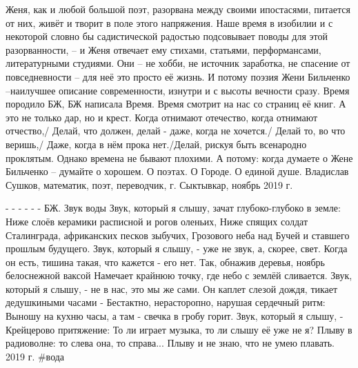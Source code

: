 Женя, как и любой большой поэт, разорвана между своими ипостасями, питается от них, живёт и творит в поле этого напряжения. Наше время в изобилии и с некоторой словно бы садистической радостью подсовывает поводы для этой разорванности, – и Женя отвечает ему стихами, статьями, перформансами, литературными студиями. Они – не хобби, не источник заработка, не спасение от повседневности – для неё это просто её жизнь. И потому поэзия Жени Бильченко –наилучшее описание современности, изнутри и с высоты вечности сразу. Время породило БЖ, БЖ написала Время. Время смотрит на нас со страниц её книг. А это не только дар, но и крест. Когда отнимают отечество, когда отнимают отчество,/ Делай, что должен, делай - даже, когда не хочется./ Делай то, во что веришь,/ Даже, когда в нём прока нет./Делай, рискуя быть всенародно проклятым.
Однако времена не бывают плохими. А потому: когда думаете о Жене Бильченко – думайте о хорошем. О поэтах. О Городе. О единой душе.
Владислав Сушков, математик, поэт, переводчик, г. Сыктывкар, ноябрь 2019 г.

- - - - - -
БЖ. Звук воды
Звук, который я слышу, зачат глубоко-глубоко в земле:
Ниже слоёв керамики расписной и рогов оленьих,
Ниже спящих солдат Сталинграда, африканских песков зыбучих,
Грозового неба над Бучей и ставшего прошлым будущего.
Звук, который я слышу, - уже не звук, а, скорее, свет.
Когда он есть, тишина такая, что кажется - его нет.
Так, обнажив деревья, ноябрь белоснежной ваксой
Намечает крайнюю точку, где небо с землёй сливается.
Звук, который я слышу, - не в нас, это мы же сами.
Он каплет слезой дождя, тикает дедушкиными часами -
Бестактно, нерасторопно, нарушая сердечный ритм:
Выношу на кухню часы, а там - свечка в гробу горит.
Звук, который я слышу, - Крейцерово притяжение:
То ли играет музыка, то ли слышу её уже не я?
Плыву в радиоволне: то слева она, то справа...
Плыву и не знаю, что не умею плавать.
2019 г. \#вода

